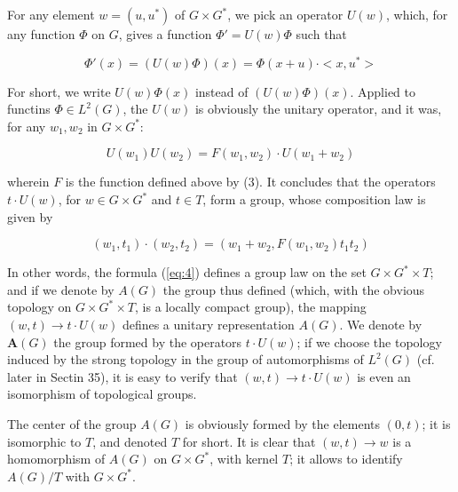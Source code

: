 \documentclass[12pt]{amsart}
\newcounter{ssection}
\renewcommand{\subsection}{
  \addtocounter{ssection}{1}{\bf  \arabic{ssection}.\  }}
\begin{document}
\subsection{}
For any element $w=(u,u^{*})$ of $G\times G^{*}$, we pick an operator
$U(w)$, which, for any function $\Phi$ on $G$, gives a function
$\Phi'=U(w)\Phi$ such that

\[
\Phi'(x)=(U(w)\Phi)(x)=\Phi(x+u)\cdot<x,u^{*}>\]


For short, we write $U(w)\Phi(x)$ instead of $(U(w)\Phi)(x)$. Applied
to functins $\Phi\in L^{2}(G)$, the $U(w)$ is obviously the unitary
operator, and it was, for any $w_{1},w_{2}$ in $G\times G^{*}$:

\[
U(w_{1})U(w_{2})=F(w_{1},w_{2})\cdot U(w_{1}+w_{2})\]


wherein $F$ is the function defined above by (3). It concludes that
the operators $t\cdot U(w)$, for $w\in G\times G^{*}$ and $t\in T$,
form a group, whose composition law is given by

\begin{equation}\label{eq:4}
(w_{1},t_{1})\cdot(w_{2},t_{2})=(w_{1}+w_{2},F(w_{1},w_{2})t_{1}t_{2})
\end{equation}

In other words, the formula (\ref{eq:4}) defines a group law
 on the set $G\times G^{*}\times T$;
and if we denote by $A(G)$ the group thus defined (which, with the
obvious topology on $G\times G^{*}\times T$, is a locally compact
group), the mapping $(w,t)\rightarrow t\cdot U(w)$ defines a unitary
representation $A(G)$. We denote by $\mathbf{A}(G)$ the group formed
by the operators $t\cdot U(w)$; if we choose the topology induced
by the strong topology  in the
group of automorphisms of $L^{2}(G)$ (cf. later in Sectin 35), it
is easy to verify that $(w,t)\rightarrow t\cdot U(w)$ is even an
isomorphism of topological groups.

The center of the group $A(G)$ is obviously formed by the elements
$(0,t)$; it is isomorphic to $T$, and denoted $T$ for short. It
is clear that $(w,t)\rightarrow w$ is a homomorphism of $A(G)$ on
$G\times G^{*}$, with kernel $T$; it allows to identify $A(G)/T$
with $G\times G^{*}$.
\end{document}
